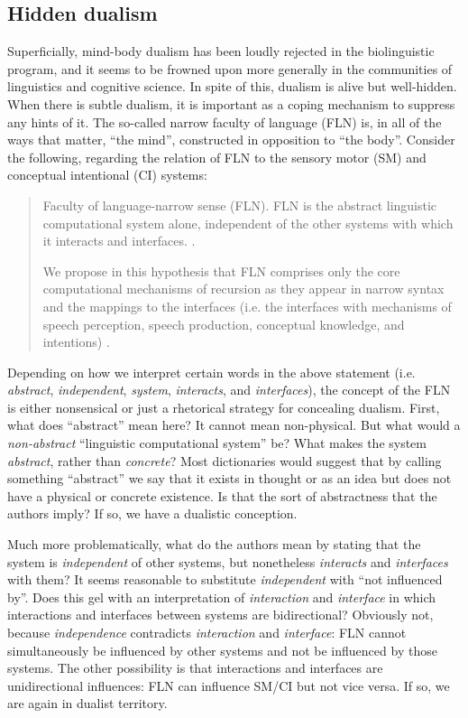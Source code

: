 \subsection{Hidden dualism}

Superficially, mind-body dualism has been loudly rejected in the biolinguistic program, and it seems to be frowned upon more generally in the communities of linguistics and cognitive science. In spite of this, dualism is alive but well-hidden. When there is subtle dualism, it is important as a coping mechanism to suppress any hints of it. The so-called narrow faculty of language (FLN) is, in all of the ways that matter, “the mind”, constructed in opposition to “the body”. Consider the following, regarding the relation of FLN to the sensory motor (SM) and conceptual intentional (CI) systems:

\begin{quote}
Faculty of language-narrow sense (FLN). FLN is the abstract linguistic computational system alone, independent of the other systems with which it interacts and interfaces. \citep{HauserEtAl2002}.

We   propose   in   this   hypothesis   that   FLN   comprises   only   the   core computational  mechanisms  of  recursion  as  they  appear  in  narrow  syntax  and  the mappings  to  the  interfaces (i.e.  the  interfaces  with  mechanisms  of  speech  perception, speech  production,  conceptual  knowledge,  and  intentions) \citep{HauserEtAl2002}.
\end{quote}


  Depending on how we interpret certain words in the above statement (i.e. \textit{abstract}, \textit{independent}, \textit{system}, \textit{interacts}, and \textit{interfaces}), the concept of the FLN is either nonsensical or just a rhetorical strategy for concealing dualism. First, what does “abstract” mean here? It cannot mean non-physical. But what would a \textit{non-abstract} “linguistic computational system” be? What makes the system \textit{abstract}, rather than \textit{concrete}? Most dictionaries would suggest that by calling something “abstract” we say that it exists in thought or as an idea but does not have a physical or concrete existence. Is that the sort of abstractness that the authors imply? If so, we have a dualistic conception. 

  Much more problematically, what do the authors mean by stating that the system is \textit{independent} of other systems, but nonetheless \textit{interacts} and \textit{interfaces} with them? It seems reasonable to substitute \textit{independent} with “not influenced by”. Does this gel with an interpretation of \textit{interaction} and \textit{interface} in which interactions and interfaces between systems are bidirectional? Obviously not, because \textit{independence} contradicts \textit{interaction} and \textit{interface}: FLN cannot simultaneously be influenced by other systems and not be influenced by those systems. The other possibility is that interactions and interfaces are unidirectional influences: FLN can influence SM/CI but not vice versa. If so, we are again in dualist territory. 

